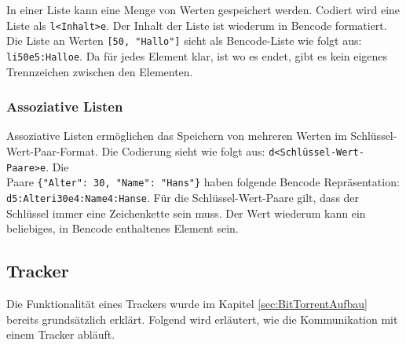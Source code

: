 In einer Liste kann eine Menge von Werten gespeichert werden. Codiert wird eine Liste als \verb|l<Inhalt>e|. Der Inhalt der Liste ist wiederum in Bencode formatiert. Die Liste an Werten \verb|[50, "Hallo"]| sieht als Bencode-Liste wie folgt aus: \verb|li50e5:Halloe|. Da für jedes Element klar, ist wo es endet, gibt es kein eigenes Trennzeichen zwischen den Elementen.

\subsubsection{Assoziative Listen}

Assoziative Listen ermöglichen das Speichern von mehreren Werten im Schlüssel-Wert-Paar-Format. Die Codierung sieht wie folgt aus: \verb|d<Schlüssel-Wert-Paare>e|. Die \\ Paare \verb|{"Alter": 30, "Name": "Hans"}| haben folgende Bencode Repräsentation: \\ \verb|d5:Alteri30e4:Name4:Hanse|. Für die Schlüssel-Wert-Paare gilt, dass der Schlüssel immer eine Zeichenkette sein muss. Der Wert wiederum kann ein beliebiges, in Bencode enthaltenes Element sein.

\subsection{Tracker}

Die Funktionalität eines Trackers wurde im Kapitel \ref{sec:BitTorrentAufbau} bereits grundsätzlich erklärt. Folgend wird erläutert, wie die Kommunikation mit einem Tracker abläuft. 

